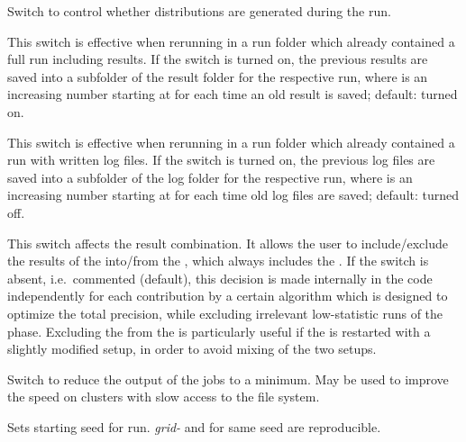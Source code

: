 \documentclass[english,11pt]{article}
\begin{document}
\quad Switch to control whether distributions are 
generated during the run.


\quad This switch is effective when rerunning in a run folder which already contained a full run 
including results. If the switch is turned on, the previous results are saved into a subfolder  of the result folder for 
the respective run, where  is an increasing number starting at  for each time an old result is saved; default: turned on.


\quad This switch is effective when rerunning in a run folder which already contained a run with written log files. If the switch is turned on, the previous log files are saved into a subfolder  of the log folder for the respective run, where  is an increasing number starting at  for each time old log files are saved; default: turned off.

\quad This switch affects the result combination. It allows the user to include/exclude the 
results of the \premainrun{} 
into/from the \resultrun{}, 
which always includes the \mainrun{}. 
If the switch is absent, i.e.\ commented (default), this decision is made 
internally in the \Matrix{} code independently for each contribution by a certain 
algorithm which is designed to optimize the total precision, while excluding 
irrelevant low-statistic runs of the \premainrun{} phase.
Excluding the \premainrun{} from the \resultrun{} is particularly useful if  
the \mainrun{} is restarted with a slightly modified setup, in order to avoid mixing of the two setups.

\quad Switch to reduce the output of the jobs to a minimum. May be used to improve the speed 
on clusters with slow access to the file system.

\quad Sets starting seed for run. {\it grid-} and \premainrun{} for same seed are reproducible.
\end{document}
